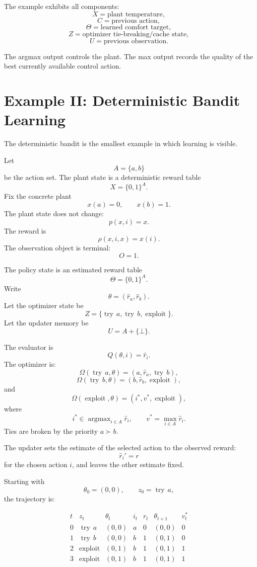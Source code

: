 The example exhibits all components:
\[
X=\text{plant temperature},
\]
\[
C=\text{previous action},
\]
\[
\Theta=\text{learned comfort target},
\]
\[
Z=\text{optimizer tie-breaking/cache state},
\]
\[
U=\text{previous observation}.
\]

The argmax output controls the plant.  The max output records the quality of the best currently
available control action.

\section{Example II: Deterministic Bandit Learning}
\label{sec:example-deterministic-bandit}

The deterministic bandit is the smallest example in which learning is visible.

Let
\[
A=\{a,b\}
\]
be the action set.  The plant state is a deterministic reward table
\[
X=\{0,1\}^A.
\]
Fix the concrete plant
\[
x(a)=0,
\qquad
x(b)=1.
\]
The plant state does not change:
\[
p(x,i)=x.
\]
The reward is
\[
\rho(x,i,x)=x(i).
\]
The observation object is terminal:
\[
O=1.
\]

The policy state is an estimated reward table
\[
\Theta=\{0,1\}^A.
\]
Write
\[
\theta=(\hat r_a,\hat r_b).
\]
Let the optimizer state be
\[
Z=\{\operatorname{try}\,a,\operatorname{try}\,b,\operatorname{exploit}\}.
\]
Let the updater memory be
\[
U=A+\{\bot\}.
\]

The evaluator is
\[
Q(\theta,i)=\hat r_i.
\]
The optimizer is:
\[
\Omega(\operatorname{try}\,a,\theta)
=
(a,\hat r_a,\operatorname{try}\,b),
\]
\[
\Omega(\operatorname{try}\,b,\theta)
=
(b,\hat r_b,\operatorname{exploit}),
\]
and
\[
\Omega(\operatorname{exploit},\theta)
=
(i^*,v^*,\operatorname{exploit}),
\]
where
\[
i^*\in \operatorname{argmax}_{i\in A}\hat r_i,
\qquad
v^*=\max_{i\in A}\hat r_i.
\]
Ties are broken by the priority \(a\succ b\).

The updater sets the estimate of the selected action to the observed reward:
\[
\hat r_i'=r
\]
for the chosen action \(i\), and leaves the other estimate fixed.

Starting with
\[
\theta_0=(0,0),
\qquad
z_0=\operatorname{try}\,a,
\]
the trajectory is:

\[
\begin{array}{c|c|c|c|c|c|c}
t & z_t & \theta_t & i_t & r_t & \theta_{t+1} & v_t^* \\
\hline
0 & \operatorname{try}\,a & (0,0) & a & 0 & (0,0) & 0 \\
1 & \operatorname{try}\,b & (0,0) & b & 1 & (0,1) & 0 \\
2 & \operatorname{exploit} & (0,1) & b & 1 & (0,1) & 1 \\
3 & \operatorname{exploit} & (0,1) & b & 1 & (0,1) & 1
\end{array}
\]

